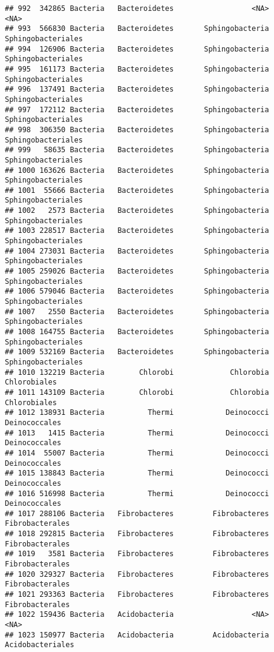 \documentclass[
]{article}
\begin{document}
\begin{verbatim}
## 992  342865 Bacteria   Bacteroidetes                  <NA>                <NA>
## 993  566830 Bacteria   Bacteroidetes       Sphingobacteria  Sphingobacteriales
## 994  126906 Bacteria   Bacteroidetes       Sphingobacteria  Sphingobacteriales
## 995  161173 Bacteria   Bacteroidetes       Sphingobacteria  Sphingobacteriales
## 996  137491 Bacteria   Bacteroidetes       Sphingobacteria  Sphingobacteriales
## 997  172112 Bacteria   Bacteroidetes       Sphingobacteria  Sphingobacteriales
## 998  306350 Bacteria   Bacteroidetes       Sphingobacteria  Sphingobacteriales
## 999   58635 Bacteria   Bacteroidetes       Sphingobacteria  Sphingobacteriales
## 1000 163626 Bacteria   Bacteroidetes       Sphingobacteria  Sphingobacteriales
## 1001  55666 Bacteria   Bacteroidetes       Sphingobacteria  Sphingobacteriales
## 1002   2573 Bacteria   Bacteroidetes       Sphingobacteria  Sphingobacteriales
## 1003 228517 Bacteria   Bacteroidetes       Sphingobacteria  Sphingobacteriales
## 1004 273031 Bacteria   Bacteroidetes       Sphingobacteria  Sphingobacteriales
## 1005 259026 Bacteria   Bacteroidetes       Sphingobacteria  Sphingobacteriales
## 1006 579046 Bacteria   Bacteroidetes       Sphingobacteria  Sphingobacteriales
## 1007   2550 Bacteria   Bacteroidetes       Sphingobacteria  Sphingobacteriales
## 1008 164755 Bacteria   Bacteroidetes       Sphingobacteria  Sphingobacteriales
## 1009 532169 Bacteria   Bacteroidetes       Sphingobacteria  Sphingobacteriales
## 1010 132219 Bacteria        Chlorobi             Chlorobia        Chlorobiales
## 1011 143109 Bacteria        Chlorobi             Chlorobia        Chlorobiales
## 1012 138931 Bacteria          Thermi            Deinococci       Deinococcales
## 1013   1415 Bacteria          Thermi            Deinococci       Deinococcales
## 1014  55007 Bacteria          Thermi            Deinococci       Deinococcales
## 1015 138843 Bacteria          Thermi            Deinococci       Deinococcales
## 1016 516998 Bacteria          Thermi            Deinococci       Deinococcales
## 1017 288106 Bacteria   Fibrobacteres         Fibrobacteres     Fibrobacterales
## 1018 292815 Bacteria   Fibrobacteres         Fibrobacteres     Fibrobacterales
## 1019   3581 Bacteria   Fibrobacteres         Fibrobacteres     Fibrobacterales
## 1020 329327 Bacteria   Fibrobacteres         Fibrobacteres     Fibrobacterales
## 1021 293363 Bacteria   Fibrobacteres         Fibrobacteres     Fibrobacterales
## 1022 159436 Bacteria   Acidobacteria                  <NA>                <NA>
## 1023 150977 Bacteria   Acidobacteria         Acidobacteria    Acidobacteriales

\end{verbatim}
\end{document}

